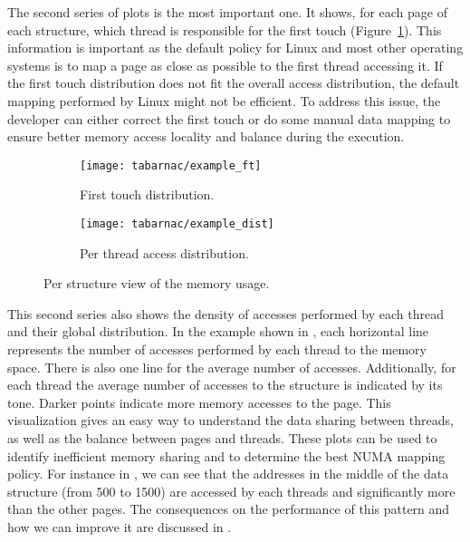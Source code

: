 The second series of plots is the most important one.
It shows, for each page of each structure, which thread is responsible for the first touch (Figure~\ref{fig:example_ft}).
This information is important as the default policy for \gls{Linux} and most other operating systems is to map a page as close as possible to the first thread accessing it.
If the first touch distribution does not fit the overall access distribution, the default mapping performed by \gls{Linux} might not be efficient.
To address this issue, the developer can either correct the first touch or do some manual data mapping to ensure better memory access locality and balance during the execution.

\begin{figure}[htb]
    \centering
    \begin{subfigure}{.49\linewidth}
        \texttt{[image: tabarnac/example\_ft]}
        \caption{First touch distribution.}
        \label{fig:example_ft}
    \end{subfigure}
    \begin{subfigure}{.49\linewidth}
        \texttt{[image: tabarnac/example\_dist]}
        \caption{Per thread access distribution.}
        \label{fig:example_dist}
    \end{subfigure}
    \caption{Per structure view of the memory usage.}
    \label{fig:example_by_structs}
\end{figure}

This second series also shows the density of accesses performed by each thread and their global distribution.
In the example shown in , each horizontal line represents the number of accesses performed by each thread to the memory space.
There is also one line for the average number of accesses.
Additionally, for each thread the average number of accesses to the structure is indicated by its tone.
Darker points indicate more memory accesses to the page. This visualization gives an easy way to understand the data sharing between threads, as well as the balance between pages and
threads.
These plots can be used to identify inefficient memory sharing and to determine the best \gls{NUMA} mapping policy.
For instance in , we can see that the addresses in the middle of the data structure (from 500 to 1500) are accessed by each threads and significantly more than the other pages.
The consequences on the performance of this pattern and how we can improve it are discussed in .


